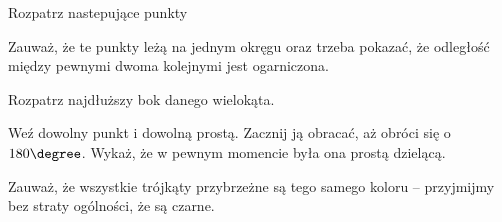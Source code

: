 
\begin{hints_list}
	\item Rozpatrz nastepujące punkty\\
	\begin{center}
	\end{center}
	\item Zauważ, że te punkty leżą na jednym okręgu oraz trzeba pokazać, że odległość między pewnymi dwoma kolejnymi jest ogarniczona.
	\item Rozpatrz najdłuższy bok danego wielokąta.
	\item Weź dowolny punkt i dowolną prostą. Zacznij ją obracać, aż obróci się o $180\degree$. Wykaż, że w pewnym momencie była ona prostą dzielącą.
	\item Zauważ, że wszystkie trójkąty przybrzeżne są tego samego koloru -- przyjmijmy bez straty ogólności, że są czarne.
	\item 
\end{hints_list}